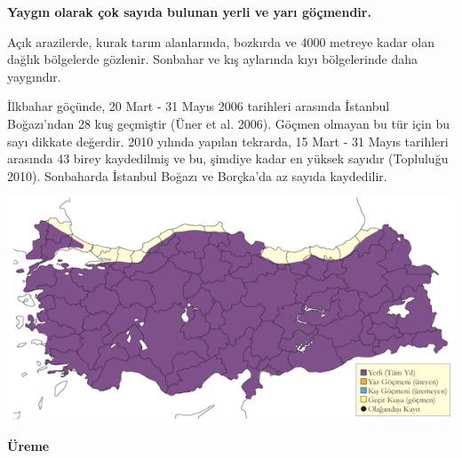 \documentclass[
  letterpaper,
  DIV=11,
  numbers=noendperiod]{scrreprt}
\begin{document}
\textbf{Yaygın olarak çok sayıda bulunan yerli ve yarı göçmendir.}

Açık arazilerde, kurak tarım alanlarında, bozkırda ve 4000 metreye kadar
olan dağlık bölgelerde gözlenir. Sonbahar ve kış aylarında kıyı
bölgelerinde daha yaygındır.

İlkbahar göçünde, 20 Mart - 31 Mayıs 2006 tarihleri arasında İstanbul
Boğazı'ndan 28 kuş geçmiştir (Üner et al. 2006). Göçmen olmayan bu tür
için bu sayı dikkate değerdir. 2010 yılında yapılan tekrarda, 15 Mart -
31 Mayıs tarihleri arasında 43 birey kaydedilmiş ve bu, şimdiye kadar en
yüksek sayıdır (Topluluğu 2010). Sonbaharda İstanbul Boğazı ve Borçka'da
az sayıda kaydedilir.

\includegraphics{images/harita_Page_110.png}

\textbf{Üreme}
\end{document}
